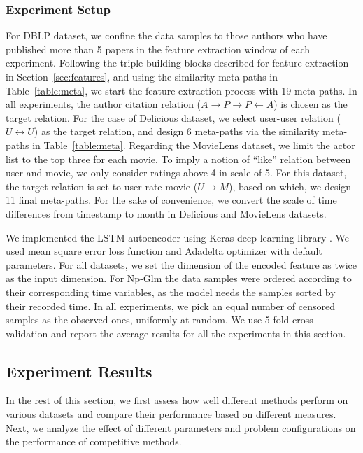 \subsubsection{Experiment Setup}


For DBLP dataset, we confine the data samples to those authors who have published more than 5 papers in the feature extraction window of each experiment. Following the triple building blocks described for feature extraction in Section~\ref{sec:features}, and using the similarity meta-paths in Table~\ref{table:meta}, we start the feature extraction process with 19 meta-paths. In all experiments, the author citation relation ($A\rightarrow P\rightarrow P\leftarrow A$) is chosen as the target relation. 
For the case of Delicious dataset, we select user-user relation ($U\leftrightarrow U$) as the target relation, and design 6 meta-paths via the similarity meta-paths in Table~\ref{table:meta}.
Regarding the MovieLens dataset, we limit the actor list to the top three for each movie. To imply a notion of ``like'' relation between user and movie, we only consider ratings above 4 in scale of 5. For this dataset, the target relation is set to user rate movie ($U\rightarrow M$), based on which, we design 11 final meta-paths. For the sake of convenience, we convert the scale of time differences from timestamp to month in Delicious and MovieLens datasets.

We implemented the LSTM autoencoder using Keras deep learning library \cite{chollet2015keras}. We used mean square error loss function and Adadelta optimizer \cite{zeiler2012adadelta} with default parameters. For all datasets, we set the dimension of the encoded feature as twice as the input dimension. For Np-Glm the data samples were ordered according to their corresponding time variables, as the model needs the samples sorted by their recorded time. In all experiments, we pick an equal number of censored samples as the observed ones, uniformly at random. We use 5-fold cross-validation and report the average results for all the experiments in this section.

\subsection{Experiment Results}
In the rest of this section, we first assess how well different methods perform on various datasets and compare their performance based on different measures. Next, we analyze the effect of different parameters and problem configurations on the performance of competitive methods.

